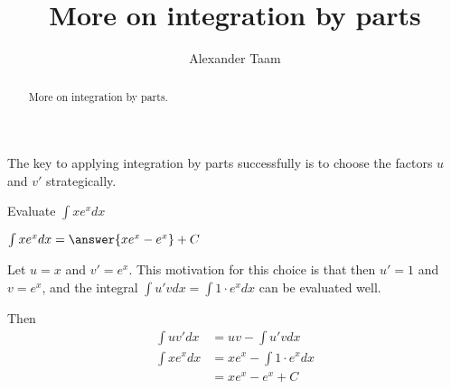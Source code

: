 \documentclass{ximera}
\title{More on integration by parts}
\author{Alexander Taam}
\begin{document}
\begin{abstract}
  More on integration by parts.
\end{abstract}
\maketitle

The key to applying integration by parts successfully is to choose the factors $u$ and $v'$ strategically.

\begin{problem}
Evaluate $\int xe^xdx$

$\int xe^xdx=\answer{xe^x-e^x}+C$

\begin{feedback}
 Let $u=x$ and $v'=e^x$. This motivation for this choice is that then $u'=1$ and $v=e^x$, and the integral $\int u'vdx=\int 1\cdot e^xdx$ can be evaluated well.

Then
\begin{align*}
\int uv'dx&=uv-\int u'vdx\\
\int xe^xdx&=xe^x-\int 1\cdot e^xdx\\
&=xe^x-e^x+C
\end{align*}
\end{feedback}
\end{problem}
\end{document}
